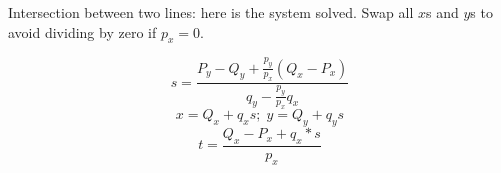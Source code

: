 Intersection between two lines: here is the system solved. Swap all $x$s and
$y$s to avoid dividing by zero if $p_x = 0$.

\[s = \frac{P_y - Q_y + \frac{p_y}{p_x}(Q_x - P_x)}{q_y - \frac{p_y}{p_x}q_x} \]
\[x = Q_x + q_x s; \; y = Q_y + q_y s \]
\[t = \frac{Q_x - P_x + q_x*s}{p_x} \]